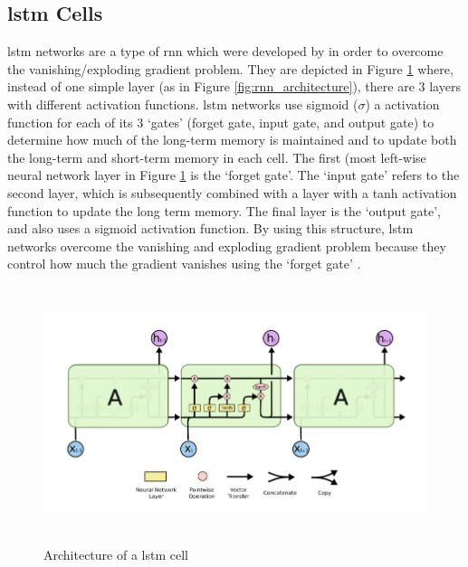 \subsection{\acrlong{lstm} Cells}
\label{sec:background_lstms}
\acrshort{lstm} networks are a type of \acrlong{rnn} which were developed by \citet{hochreiter1997long} in order to overcome the vanishing/exploding gradient problem. They are depicted in Figure \ref{fig:lstm_architecture} where, instead of one simple layer (as in Figure \ref{fig:rnn_architecture}), there are 3 layers with different activation functions. \acrshort{lstm} networks use sigmoid ($\sigma$) a activation function for each of its 3 `gates' (forget gate, input gate, and output gate) to determine how much of the long-term memory is maintained and to update both the long-term and short-term memory in each cell. The first (most left-wise neural network layer in Figure \ref{fig:lstm_architecture} is the `forget gate'. The `input gate' refers to the second layer, which is subsequently combined with a layer with a tanh activation function to update the long term memory. The final layer is the `output gate', and also uses a sigmoid activation function. By using this structure, \acrshort{lstm} networks overcome the vanishing and exploding gradient problem because they control how much the gradient vanishes using the `forget gate' \citep{Gers}.

\begin{figure}[h]
    \centering
    \includegraphics[height=7.5cm,trim={0 0 0 0cm},clip]{Paper/images/lstm.png}
    \caption{Architecture of a \acrlong{lstm} cell \citep{olah2015understanding}}
    \label{fig:lstm_architecture}
\end{figure}

